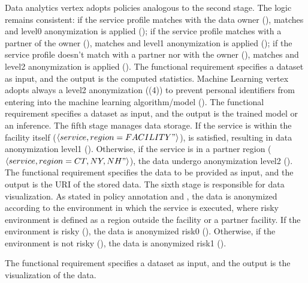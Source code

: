 Data analytics vertex adopts policies analogous to the second stage. The logic remains consistent:
if the service profile matches with the data owner (\pone),  matches and level0 anonymization is applied ();
if the service profile matches with a partner of the owner (\ptwo),  matches and level1 anonymization is applied  ();
if the service profile doesn't match with a partner nor with the owner (\pthree),  matches and level2 anonymization is applied ().
The functional requirement specifies a dataset as input, and the output is the computed statistics.
Machine Learning vertex adopts always a level2 anonymization (\p(4)) to prevent personal identifiers from entering into the machine learning algorithm/model ().
The functional requirement specifies a dataset as input, and the output is the trained model or an inference.
The fifth stage manages data storage.
If the service is within the facility itself ($\langle service,region=FACILITY"\rangle$),  is satisfied, resulting in data anonymization level1 ().
Otherwise, if the service is in a partner region ($\langle service,region={CT,NY,NH}"\rangle$), the data undergo anonymization level2 ().
The functional requirement specifies the data to be provided as input, and the output is the URI of the stored data.
The sixth stage is responsible for data visualization.
As stated in policy annotation  and , the data is anonymized according to the environment in which the service is executed,
where risky environment is defined as a region outside the facility or a partner facility.
If the environment is risky (), the data is anonymized risk0 ().
Otherwise, if the environment is not risky (), the data is anonymized risk1 ().

The functional requirement specifies a dataset as input, and the output is the visualization of the data.

